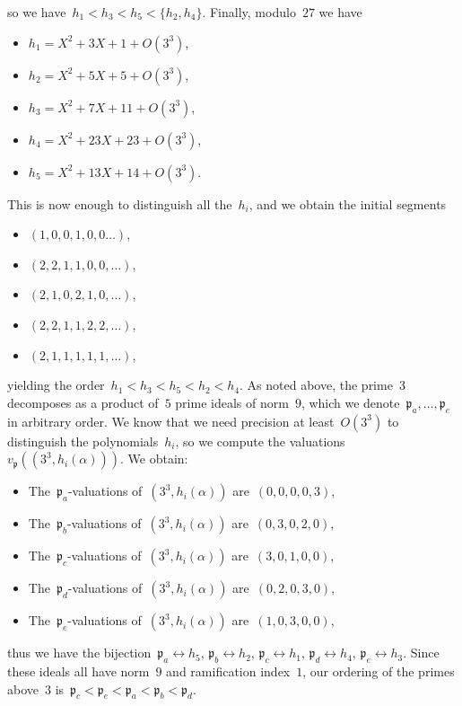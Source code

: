 \documentclass{article}
\def\p{{\mathfrak p}}
\begin{document}
so we have~$h_1<h_3<h_5<\{h_2,h_4\}$. Finally, modulo~$27$ we have
\begin{itemize}
  \item $h_1 = X^2 + 3X + 1 + O(3^3)$,
  \item $h_2 = X^2 + 5X + 5 + O(3^3)$,
  \item $h_3 = X^2 + 7X + 11 + O(3^3)$,
  \item $h_4 = X^2 + 23X + 23 + O(3^3)$,
  \item $h_5 = X^2 + 13X + 14 + O(3^3)$.
\end{itemize}
This is now enough to distinguish all the~$h_i$, and we obtain the initial segments
\begin{itemize}
  \item $(1,0,0,1,0,0\dots)$,
  \item $(2,2,1,1,0,0,\dots)$,
  \item $(2,1,0,2,1,0,\dots)$,
  \item $(2,2,1,1,2,2,\dots)$,
  \item $(2,1,1,1,1,1,\dots)$,
\end{itemize}
yielding the order~$h_1 < h_3 < h_5 < h_2 < h_4$.
As noted above, the prime~$3$ decomposes as a product of~$5$ prime ideals of norm~$9$,
which we denote~$\p_a, \dots, \p_e$ in arbitrary order. We know that we need
precision at least~$O(3^3)$ to distinguish the polynomials~$h_i$, so we compute
the valuations~$v_\p((3^3,h_i(\alpha)))$. We obtain:
\begin{itemize}
  \item The~$\p_a$-valuations of~$(3^3,h_i(\alpha))$ are~$(0,0,0,0,3)$,
  \item The~$\p_b$-valuations of~$(3^3,h_i(\alpha))$ are~$(0,3,0,2,0)$,
  \item The~$\p_c$-valuations of~$(3^3,h_i(\alpha))$ are~$(3,0,1,0,0)$,
  \item The~$\p_d$-valuations of~$(3^3,h_i(\alpha))$ are~$(0,2,0,3,0)$,
  \item The~$\p_e$-valuations of~$(3^3,h_i(\alpha))$ are~$(1,0,3,0,0)$,
\end{itemize}
thus we have the bijection~$\p_a\leftrightarrow h_5$, $\p_b\leftrightarrow h_2$,
$\p_c\leftrightarrow h_1$, $\p_d\leftrightarrow h_4$, $\p_e\leftrightarrow h_3$.
Since these ideals all have norm~$9$ and ramification index~$1$, our ordering of
the primes above~$3$ is~$\p_c < \p_e < \p_a < \p_b < \p_d$.
\end{document}
